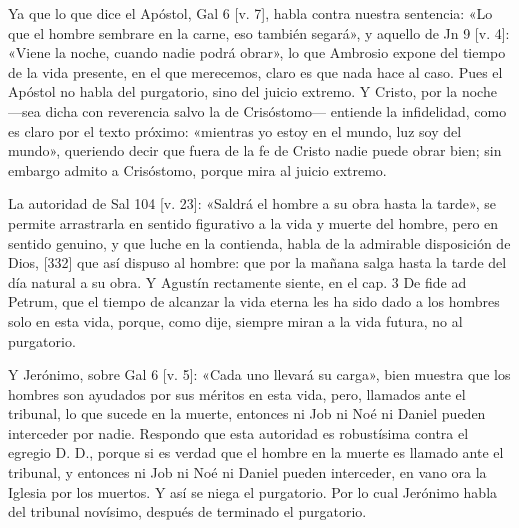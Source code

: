 Ya que lo que dice el Apóstol, Gal 6 [v. 7], habla contra nuestra sentencia: «Lo que el hombre sembrare en la carne, eso también segará», y aquello de Jn 9 [v. 4]: «Viene la noche, cuando nadie podrá obrar», lo que Ambrosio expone del tiempo de la vida presente, en el que merecemos, claro es que nada hace al caso. Pues el Apóstol no habla del purgatorio, sino del juicio extremo. Y Cristo, por la noche —sea dicha con reverencia salvo la de Crisóstomo— entiende la infidelidad, como es claro por el texto próximo: «mientras yo estoy en el mundo, luz soy del mundo», queriendo decir que fuera de la fe de Cristo nadie puede obrar bien; sin embargo admito a Crisóstomo, porque mira al juicio extremo.

La autoridad de Sal 104 [v. 23]: «Saldrá el hombre a su obra hasta la tarde», se permite arrastrarla en sentido figurativo a la vida y muerte del hombre, pero en sentido genuino, y que luche en la contienda, habla de la admirable disposición de Dios, [332] que así dispuso al hombre: que por la mañana salga hasta la tarde del día natural a su obra. Y Agustín rectamente siente, en el cap. 3 De fide ad Petrum, que el tiempo de alcanzar la vida eterna les ha sido dado a los hombres solo en esta vida, porque, como dije, siempre miran a la vida futura, no al purgatorio.

Y Jerónimo, sobre Gal 6 [v. 5]: «Cada uno llevará su carga», bien muestra que los hombres son ayudados por sus méritos en esta vida, pero, llamados ante el tribunal, lo que sucede en la muerte, entonces ni Job ni Noé ni Daniel pueden interceder por nadie. Respondo que esta autoridad es robustísima contra el egregio D. D., porque si es verdad que el hombre en la muerte es llamado ante el tribunal, y entonces ni Job ni Noé ni Daniel pueden interceder, en vano ora la Iglesia por los muertos. Y así se niega el purgatorio. Por lo cual Jerónimo habla del tribunal novísimo, después de terminado el purgatorio.

